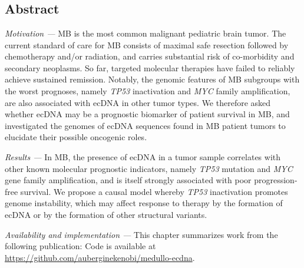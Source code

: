 \chapter{\medullotitle}
\label{chap:medullo}
\glsresetall
\clearpage

\section{Abstract}
\par\textit{Motivation ---} \Gls{MB} is the most common malignant pediatric brain tumor. The current standard of care for \gls{MB} consists of maximal safe resection followed by chemotherapy and/or radiation, and carries substantial risk of co-morbidity and secondary neoplasms. So far, targeted molecular therapies have failed to reliably achieve sustained remission. Notably, the genomic features of \gls{MB} subgroups with the worst prognoses, namely \textit{TP53} inactivation and \textit{MYC} family amplification, are also associated with ecDNA in other tumor types. We therefore asked whether \gls{ecDNA} may be a prognostic biomarker of patient survival in \gls{MB}, and investigated the genomes of \gls{ecDNA} sequences found in \gls{MB} patient tumors to elucidate their possible oncogenic roles.
\par\textit{Results ---} In \gls{MB}, the presence of ecDNA in a tumor sample correlates with other known molecular prognostic indicators, namely \textit{TP53} mutation and \textit{MYC} gene family amplification, and is itself strongly associated with poor progression-free survival. We propose a causal model whereby \textit{TP53} inactivation promotes genome instability, which may affect response to therapy by the formation of ecDNA or by the formation of other structural variants.
\par\textit{Availability and implementation ---} This chapter summarizes work from the following publication: \cite{Chapman}
Code is available at \url{https://github.com/auberginekenobi/medullo-ecdna}.  

